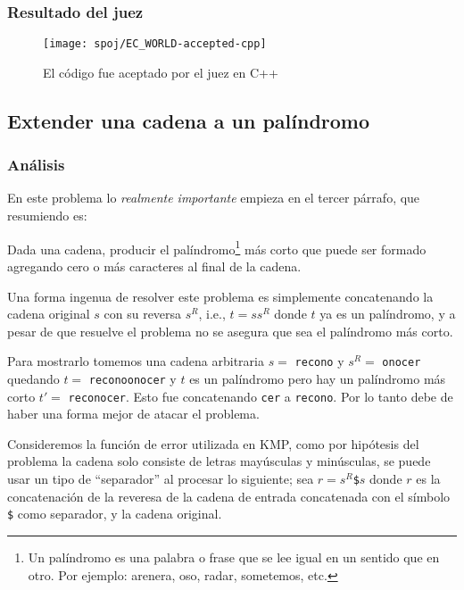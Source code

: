 \subsubsection{Resultado del juez}
\begin{figure}[H]
\centering
\texttt{[image: spoj/EC\_WORLD-accepted-cpp]}
\caption{El código fue aceptado por el juez en C++}
\end{figure}

\newpage


\subsection{Extender una cadena a un palíndromo}

\subsubsection{Análisis}
En este problema lo \textit{realmente importante} empieza en el tercer párrafo, que resumiendo es:

\begin{tcolorbox}
Dada una cadena, producir el palíndromo\footnote{Un palíndromo es una palabra o frase que se lee
igual en un sentido que en otro. Por ejemplo: arenera, oso, radar, sometemos, etc.} más corto que
puede ser formado agregando cero o más caracteres al final de la cadena.
\end{tcolorbox}

Una forma ingenua de resolver este problema es simplemente concatenando la cadena original $s$
con su reversa $s^R$, i.e., $t = ss^R$ donde $t$ ya es un palíndromo, y a pesar de que resuelve el
problema no se asegura que sea el palíndromo más corto.

Para mostrarlo tomemos una cadena arbitraria $s = $ \texttt{recono} y $s^R =$ \texttt{onocer}
quedando $t = $ \texttt{reconoonocer} y $t$ es un palíndromo pero hay un palíndromo más corto
$t' = $ \texttt{reconocer}. Esto fue concatenando \texttt{cer} a \texttt{recono}. 
Por lo tanto debe de haber una forma mejor de atacar el problema.

Consideremos la función de error utilizada en KMP, como por hipótesis del problema la cadena solo
consiste de letras mayúsculas y minúsculas, se puede usar un tipo de ``separador'' al procesar lo
siguiente; sea $r = s^R$\texttt{\$}$s$ donde $r$ es la concatenación de la reveresa de la cadena de
entrada concatenada con el símbolo \texttt{\$} como separador, y la cadena original.

